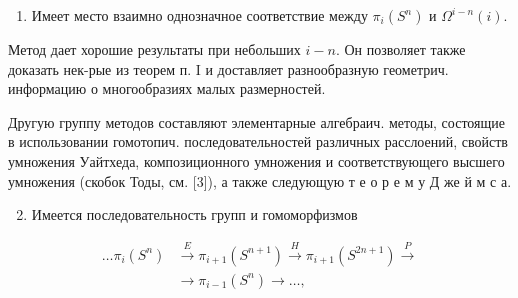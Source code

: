 \documentclass[10pt]{article}
\begin{document}
\begin{enumerate}

  \item Имеет место взаимно однозначное соответствие между $\pi_{i}\left(S^{n}\right)$ и $\Omega^{i-n}(i)$.

\end{enumerate}



Метод дает хорошие результаты при небольших $i-n$. Он позволяет также доказать нек-рые из теорем п. I и доставляет разнообразную геометрич. информацию о многообразиях малых размерностей.



Другую группу методов составляют элементарные алгебраич. методы, состоящие в использовании гомотопич. последовательностей различных расслоений, свойств умножения Уайтхеда, композиционного умножения и соответствующего высшего умножения (скобок Тоды, см. [3]), а также следующую т е о р е м у Д же й м с а.



\begin{enumerate}

  \setcounter{enumi}{1}

  \item Имеется последовательность групп и гомоморфизмов

\end{enumerate}



\[

\begin{aligned}

\ldots \pi_{i}\left(S^{n}\right) & \stackrel{E}{\longrightarrow} \pi_{i+1}\left(S^{n+1}\right) \stackrel{H}{\longrightarrow} \pi_{i+1}\left(S^{2 n+1}\right) \stackrel{P}{\longrightarrow} \\

& \longrightarrow \pi_{i-1}\left(S^{n}\right) \longrightarrow \ldots,

\end{aligned}

\]
\end{document}
